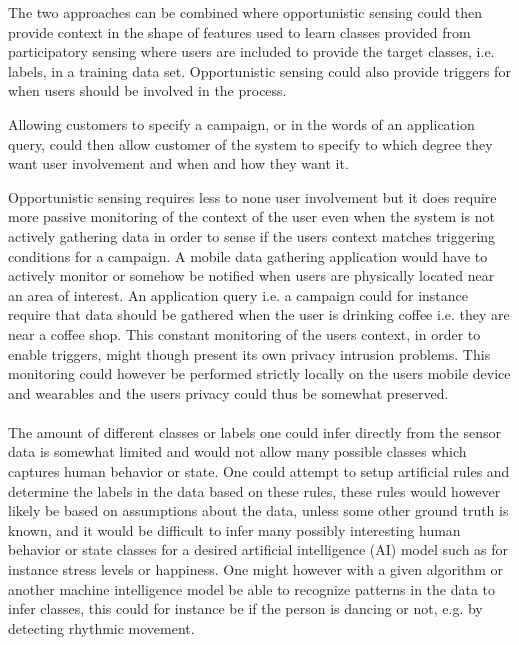 The two approaches can be combined where opportunistic sensing could then provide context in the shape of features used to learn classes provided from participatory sensing where users are included to provide the target classes, i.e. labels, in a training data set. Opportunistic sensing could also provide triggers for when users should be involved in the process.  

Allowing customers to specify a campaign, or in the words of \parencite{opp_or_par} an application query, could then allow customer of the system to specify to which degree they want user involvement and when and how they want it.

Opportunistic sensing requires less to none user involvement but it does require more passive monitoring of the context of the user even when the system is not actively gathering data in order to sense if the users context matches triggering conditions for a campaign. A mobile data gathering application would have to actively monitor or somehow be notified when users are physically located near an area of interest. An application query i.e. a campaign could for instance require that data should be gathered when the user is drinking coffee i.e. they are near a coffee shop. This constant monitoring of the users context, in order to enable triggers, might though present its own privacy intrusion problems. This monitoring could however be performed strictly locally on the users mobile device and wearables and the users privacy could thus be somewhat preserved.   
\\\\
The amount of different classes or labels one could infer directly from the sensor data is somewhat limited and would not allow many possible classes which captures human behavior or state. One could attempt to setup artificial rules and determine the labels in the data based on these rules, these rules would however likely be based on assumptions about the data, unless some other ground truth is known, and it would be difficult to infer many possibly interesting human behavior or state classes for a desired artificial intelligence (AI) model such as for instance stress levels or happiness. One might however with a given algorithm or another machine intelligence model be able to recognize patterns in the data to infer classes, this could for instance be if the person is dancing or not, e.g. by detecting rhythmic movement.    
